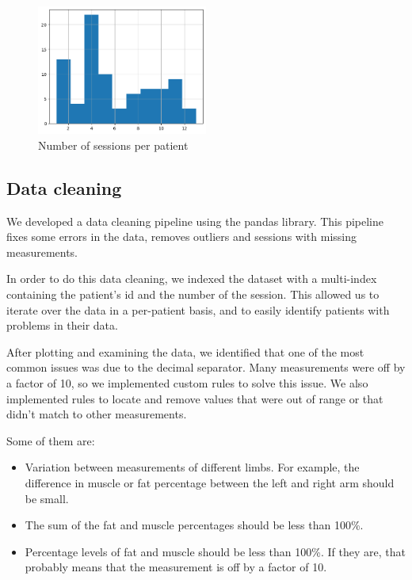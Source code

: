 \begin{figure}[h]
    \centering
    \includegraphics[width=0.5\textwidth]{files/sessions_per_patient}
    \caption{Number of sessions per patient}
    \label{fig:sessions-per-patient}
\end{figure}

\subsection{Data cleaning}

We developed a data cleaning pipeline using the \gls{pandas} library. This
pipeline fixes some errors in the data, removes outliers and sessions with
missing measurements.

In order to do this data cleaning, we indexed the dataset with a multi-index
containing the patient's id and the number of the session. This allowed us to
iterate over the data in a per-patient basis, and to easily identify patients
with problems in their data.

After plotting and examining the data, we identified that one of the most
common issues was due to the decimal separator. Many measurements were off by a
factor of 10, so we implemented custom rules to solve this issue. We also
implemented rules to locate and remove values that were out of range or that
didn't match to other measurements.

Some of them are:

\begin{itemize}
    \item Variation between measurements of different limbs. For example, the difference
          in muscle or fat percentage between the left and right arm should be small.
    \item The sum of the fat and muscle percentages should be less than 100\%.
    \item Percentage levels of fat and muscle should be less than 100\%. If they are,
          that probably means that the measurement is off by a factor of 10.
\end{itemize}

